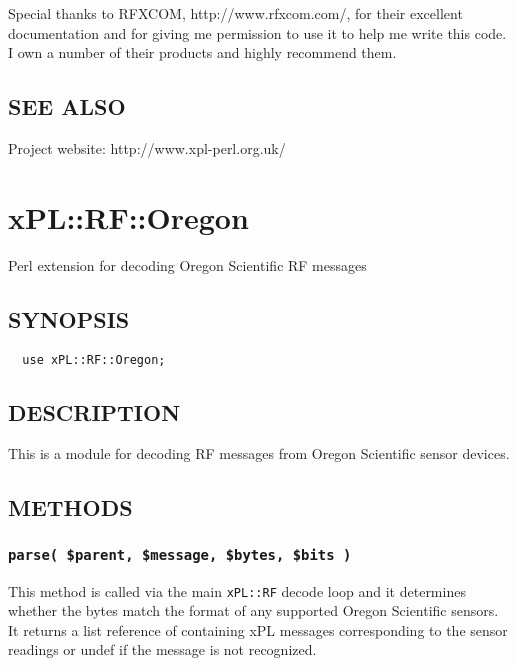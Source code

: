 Special thanks to RFXCOM, \textsf{http://www.rfxcom.com/}, for their
excellent documentation and for giving me permission to use it to help
me write this code.  I own a number of their products and highly
recommend them.

\subsection*{SEE ALSO\label{xPL::RF::HomeEasy_SEE_ALSO}}


Project website: http://www.xpl-perl.org.uk/

\section{xPL::RF::Oregon\label{xPL::RF::Oregon}}


Perl extension for decoding Oregon Scientific RF messages

\subsection*{SYNOPSIS\label{xPL::RF::Oregon_SYNOPSIS}}
\begin{verbatim}
  use xPL::RF::Oregon;
\end{verbatim}
\subsection*{DESCRIPTION\label{xPL::RF::Oregon_DESCRIPTION}}


This is a module for decoding RF messages from Oregon Scientific
sensor devices.

\subsection*{METHODS\label{xPL::RF::Oregon_METHODS}}
\subsubsection*{\texttt{parse( \$parent, \$message, \$bytes, \$bits )}\label{xPL::RF::Oregon_parse_parent_message_bytes_bits_}}


This method is called via the main \texttt{xPL::RF} decode loop and it
determines whether the bytes match the format of any supported Oregon
Scientific sensors.  It returns a list reference of containing xPL
messages corresponding to the sensor readings or undef if the message
is not recognized.

